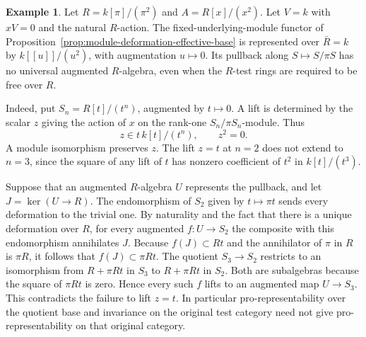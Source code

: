 \documentclass[12pt,a4paper,english,reqno]{amsart}
\numberwithin{equation}{section}
\theoremstyle{plain}
\theoremstyle{definition}
\newtheorem{example}[theorem]{Example}
\begin{document}
\begin{example}\label{ex:artin-module-deformation-nonrepresentable}
Let $R=k[\pi]/(\pi^2)$ and $A=R[x]/(x^2)$. Let $V=k$ with
$xV=0$ and the natural $R$-action. The fixed-underlying-module
functor of Proposition~\ref{prop:module-deformation-effective-base}
is represented over $\bar R=k$ by $k[[u]]/(u^2)$, with
augmentation $u\mapsto0$. Its pullback along $S\mapsto S/\pi S$
has no universal augmented $R$-algebra, even when the $R$-test
rings are required to be free over $R$.

Indeed, put $S_n=R[t]/(t^n)$, augmented by $t\mapsto0$.
A lift is determined by the scalar $z$ giving the action of
$x$ on the rank-one $S_n/\pi S_n$-module. Thus
\[
 z\in t\,k[t]/(t^n),\qquad z^2=0.
\]
A module isomorphism preserves $z$. The lift $z=t$ at $n=2$
does not extend to $n=3$, since the square of any lift of $t$
has nonzero coefficient of $t^2$ in $k[t]/(t^3)$.

Suppose that an augmented $R$-algebra $U$ represents the
pullback, and let $J=\ker(U\to R)$. The endomorphism of $S_2$
given by $t\mapsto\pi t$ sends every deformation to the
trivial one. By naturality and the fact that there is a
unique deformation over $R$, for every augmented $f:U\to S_2$
the composite with this endomorphism annihilates $J$.
Because $f(J)\subset Rt$ and the annihilator of $\pi$ in
$R$ is $\pi R$, it follows that $f(J)\subset \pi Rt$.
The quotient $S_3\to S_2$ restricts to an isomorphism from
$R+\pi Rt$ in $S_3$ to $R+\pi Rt$ in $S_2$. Both are
subalgebras because the square of $\pi Rt$ is zero.
Hence every such $f$ lifts to an augmented map $U\to S_3$.
This contradicts the failure to lift $z=t$. In particular
pro-representability over the quotient base and invariance
on the original test category need not give
pro-representability on that original category.
\end{example}
\end{document}
